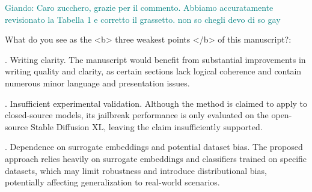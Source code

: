 \documentclass{ar2rc}
\newcommand{\giando}[1]{\textcolor{teal}{Giando: #1}}
\begin{document}
    \AC \giando{Caro zucchero, grazie per il commento. Abbiamo accuratamente revisionato la Tabella 1 e corretto il grassetto. non so chegli devo di so gay}
        


\RC What do you see as the <b> three weakest points </b> of this manuscript?:

    . Writing clarity. The manuscript would benefit from substantial improvements in writing quality and clarity, as certain sections lack logical coherence and contain numerous minor language and presentation issues.

    . Insufficient experimental validation. Although the method is claimed to apply to closed-source models, its jailbreak performance is only evaluated on the open-source Stable Diffusion XL, leaving the claim insufficiently supported.

    . Dependence on surrogate embeddings and potential dataset bias. The proposed approach relies heavily on surrogate embeddings and classifiers trained on specific datasets, which may limit robustness and introduce distributional bias, potentially affecting generalization to real-world scenarios.




\AR 
\end{document}
